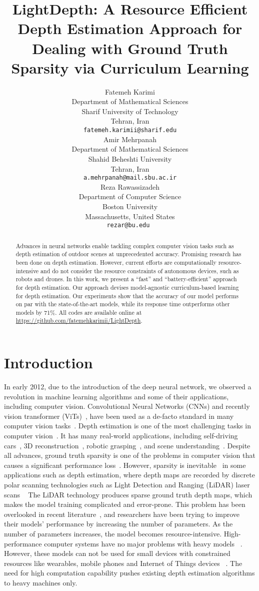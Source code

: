\documentclass{article}
\title{LightDepth: A Resource Efficient Depth Estimation Approach for Dealing with Ground Truth Sparsity via Curriculum Learning}
\author{
 Fatemeh Karimi \\
  Department of Mathematical Sciences\\
  Sharif University of Technology\\
  Tehran, Iran \\
  \texttt{fatemeh.karimii@sharif.edu} \\
\And
 Amir Mehrpanah\\
    Department of Mathematical Sciences\\
    Shahid Beheshti University\\
    Tehran, Iran \\
    \texttt{a.mehrpanah@mail.sbu.ac.ir} \\
  \And
 Reza Rawassizadeh  \\
  Department of Computer Science\\
  Boston University\\
  Massachusetts, United States \\
  \texttt{rezar@bu.edu } \\
}
\begin{document}
\maketitle

\begin{abstract}
Advances in neural networks enable tackling complex computer vision tasks such as depth estimation of outdoor scenes at unprecedented accuracy. Promising research has been done on depth estimation. However, current efforts are computationally resource-intensive and do not consider the resource constraints of autonomous devices, such as robots and drones. In this work, we present a “fast” and “battery-efficient” approach for depth estimation. Our approach devises model-agnostic curriculum-based learning for depth estimation. Our experiments show that the accuracy of our model performs on par with the state-of-the-art models, while its response time outperforms other models by 71\%. All codes are available online at \url{https://github.com/fatemehkarimii/LightDepth}.
\end{abstract}

\section{Introduction}
\label{sec:introduction}
In early 2012, due to the introduction of the deep neural network, we observed a revolution in machine learning algorithms and some of their applications, including computer vision. Convolutional Neural Networks (CNNs) and recently vision transformer (ViTs)~\cite{han2022survey}, have been used as a de-facto standard in many computer vision tasks~\cite{khan2018guide}. Depth estimation is one of the most challenging tasks in computer vision~\cite{zhan2018unsupervised}. It has many real-world applications, including self-driving cars~\cite{cui2019real}, 3D reconstruction~\cite{diamantas2010depth}, robotic grasping~\cite{walz2020uncertainty}, and scene understanding~\cite{chen2019towards}. 
Despite all advances, ground truth sparsity is one of the problems in computer vision that causes a significant performance loss~\cite{uhrig2017sparsity}. However, sparsity is inevitable~\cite{geiger2013vision} in some applications such as depth estimation, where depth maps are recorded by discrete polar scanning technologies such as Light Detection and Ranging (LiDAR) laser scans ~\cite{lefsky2002lidar} The LiDAR technology produces sparse ground truth depth maps, which makes the model training complicated and error-prone. This problem has been overlooked in recent literature~\cite{alhashim2018high,dorn,adabins, bts}, and researchers have been trying to improve their models' performance by increasing the number of parameters.
As the number of parameters increases, the model becomes resource-intensive.  High-performance computer systems have no major problems with heavy models ~\cite{fedak2001xtremweb, schroeder2009large}. However, these models can not be used for small devices  with constrained resources like wearables, mobile phones and Internet of Things devices ~\cite{gan2021, rong2022}. The need for high computation capability pushes existing depth estimation algorithms to heavy machines only. 
\end{document}
